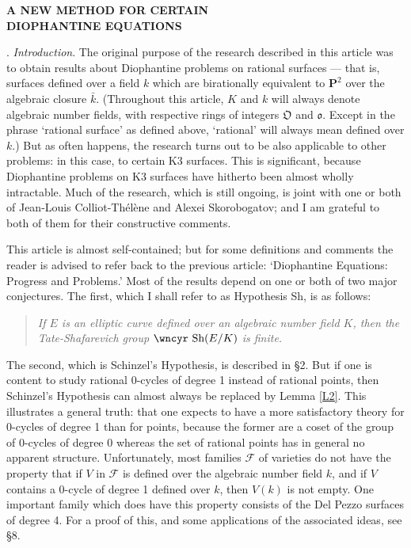 \documentclass[12pt]{article}
\def\bP{{\mathbf P}}
\def\fO{{\mathfrak O}}
\def\fo{{\mathfrak o}}
\def\sF{{\mathcal F}}
\def\Sha{\mbox{\wncyr Sh}}
\begin{document}
\begin{center}
\textbf{A NEW METHOD FOR CERTAIN \\ DIOPHANTINE EQUATIONS}
\end{center}


\vskip 0.1in


. \emph{Introduction}. \newline
The original purpose of the research described in this article was to obtain
results about Diophantine problems on rational surfaces --- that is, surfaces
defined over a field $k$ which are birationally equivalent to $\bP^2$ over
the algebraic closure $\bar{k}$. (Throughout this article, $K$ and $k$ will
always denote algebraic number fields, with respective rings of integers $\fO$
and $\fo$. Except in the phrase `rational surface' as defined above, `rational'
will always mean defined over $k$.) But as often happens, the research
turns out to be also applicable to other problems: in this case, to certain K3
surfaces. This is significant, because Diophantine problems on K3 surfaces have
hitherto been almost wholly intractable. Much of the research, which is still
ongoing, is joint with one or
both of Jean-Louis Colliot-Th\'{e}l\`{e}ne and Alexei Skorobogatov; and I am
grateful to both of them for their constructive comments.

This article is almost self-contained; but for some definitions and comments
the reader is advised to refer back to the previous article: `Diophantine
Equations: Progress and Problems.'
Most of the results depend on one or both of two major conjectures. The
first, which I shall refer to as Hypothesis \Sha, is as follows:
\begin{quote}
\emph{If $E$ is an elliptic curve defined over an algebraic number field $K$,
then the Tate-Shafarevich group $\Sha(E/K)$ is finite.}
\end{quote}
The second, which is Schinzel's Hypothesis, is described in \S2. But if one
is content to study rational 0-cycles of degree 1 instead of rational points,
then Schinzel's Hypothesis can almost always be replaced by 
Lemma \ref{L2}. This illustrates a general truth: that one
expects to have a more satisfactory theory
for 0-cycles of degree 1 than for points, because the former are a coset of the
group of 0-cycles of degree 0 whereas the set of rational
points has in general no apparent structure. Unfortunately, most families
$\sF$ of varieties do not have the property that if
$V$ in $\sF$ is defined over the algebraic number field $k$, and if $V$
contains a 0-cycle of degree 1 defined over $k$, then $V(k)$ is not empty.
One important family which does have this property consists of the Del Pezzo
surfaces of degree 4. For a proof of this, and some applications of the
associated ideas, see \S8. 
\end{document}

